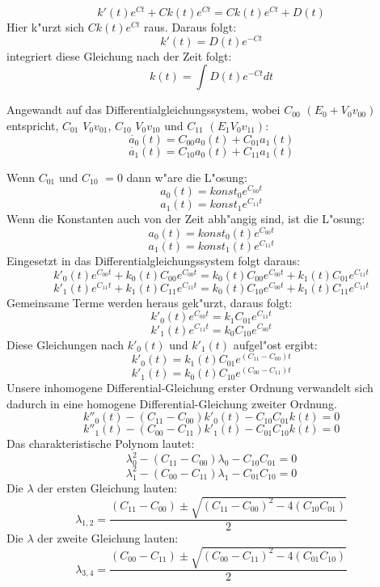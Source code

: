 \begin{refsection}
\[
\ k'(t) e^{C t} + C k(t) e^{C t} = C k(t) e^{C t} + D(t)
\] 
Hier k"urzt sich $ C k(t) e^{C t} $ raus.
Daraus folgt:
\[
\ k'(t) = D(t) e^{-C t}
\] 
integriert diese Gleichung nach der Zeit folgt:
\[
\ k(t) = \int D(t) e^{-C t} dt 
\]
 
Angewandt auf das Differentialgleichungssystem, wobei $C_{00}$ $(E_{0} + V_{0} v_{00})$ entspricht, $C_{01}$ $V_{0} v_{01}$, $C_{10}$ $V_{0} v_{10}$ und $C_{11}$ $(E_{1} V_{0} v_{11})$:
\[
\ \dot{a_{0}}(t) = C_{00}a_{0}(t) + C_{01}a_{1}(t)
\]
\[
\ \dot{a_{1}}(t) = C_{10}a_{0}(t) + C_{11}a_{1}(t)
\]

Wenn $ C_{01}$ und $ C_{10}$ $ =0$ dann w"are die L"osung:
\[
\ a_{0}(t) = \text{$konst_{0}$} e^{C_{00} t} 
\]
\[
\ a_{1}(t) = \text{$konst_{1}$} e^{C_{11} t}
\]
Wenn die Konstanten auch von der Zeit abh"angig sind, ist die L"osung: 
\[
\ a_{0}(t) = \text{$konst_{0}(t)$} e^{C_{00} t} 
\]
\[
\ a_{1}(t) = \text{$konst_{1}(t)$} e^{C_{11} t} 
\]
Eingesetzt in das Differentialgleichungssystem folgt daraus:
\[
\ k'_{0}(t) e^{C_{00} t} + k_{0}(t) C_{00} e^{C_{00} t} = k_{0}(t) C_{00} e^{C_{00} t} + k_{1}(t)C_{01}e^{C_{11} t}
\]
\[
\ k'_{1}(t) e^{C_{11} t} + k_{1}(t) C_{11} e^{C_{11} t} = k_{0}(t) C_{10} e^{C_{00} t} + k_{1}(t)C_{11}e^{C_{11} t}
\]
Gemeinsame Terme werden heraus gek"urzt, daraus folgt:
\[
\ k'_{0}(t) e^{C_{00} t} = k_{1} C_{01} e^{C_{11} t}
\]
\[
\ k'_{1}(t) e^{C_{11} t} = k_{0} C_{10} e^{C_{00} t}
\]
Diese Gleichungen nach $ k'_{0}(t)$ und $ k'_{1}(t)$ aufgel"ost ergibt:
\[
\ k'_{0}(t) = k_{1}(t) C_{01} e^{(C_{11}-C_{00}) t}
\]
\[
\ k'_{1}(t) = k_{0}(t) C_{10} e^{(C_{00}-C_{11}) t}
\]
Unsere inhomogene Differential-Gleichung erster Ordnung verwandelt
sich dadurch in eine homogene Differential-Gleichung zweiter Ordnung.
\[ 
\ k''_{0}(t) - (C_{11}-C_{00}) k'_{0}(t) - C_{10}C_{01}k(t) = 0
\]
\[
\ k''_{1}(t) - (C_{00}-C_{11}) k'_{1}(t) - C_{01}C_{10}k(t) = 0
\]
Das charakteristische Polynom lautet:
\[
\ \lambda_{0}^{2} - (C_{11}-C_{00})\lambda_{0} - C_{10}C_{01} = 0
\]
\[
\ \lambda_{1}^{2} - (C_{00}-C_{11})\lambda_{1} - C_{01}C_{10} = 0
\]
Die $ \lambda $ der ersten Gleichung lauten:
\[
\ \lambda_{1,2} = \frac{(C_{11}-C_{00})\pm \sqrt{(C_{11}-C_{00})^2-4(C_{10}C_{01})}}{2}
\]
Die $ \lambda $ der zweite Gleichung lauten:
\[
\ \lambda_{3,4} = \frac{(C_{00}-C_{11})\pm \sqrt{(C_{00}-C_{11})^2-4(C_{01}C_{10})}}{2}
\]


\end{refsection}
